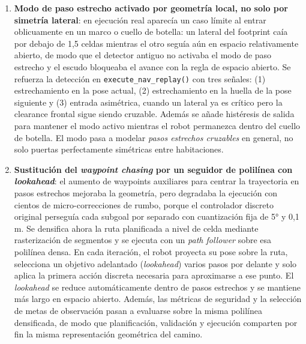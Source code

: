 \documentclass[11pt,a4paper]{article}
\begin{document}
\begin{enumerate}
  \item \textbf{Modo de paso estrecho activado por geometría local, no solo por
        simetría lateral}: en ejecución real aparecía un caso límite al entrar
        oblicuamente en un marco o cuello de botella: un lateral del footprint
        caía por debajo de 1{,}5 celdas mientras el otro seguía aún en espacio
        relativamente abierto, de modo que el detector antiguo no activaba el
        modo de paso estrecho y el escudo bloqueaba el avance con la regla de
        espacio abierto. Se refuerza la detección en
        \texttt{execute\_nav\_replay()} con tres señales:
        (1) estrechamiento en la pose actual, (2) estrechamiento en la huella
        de la pose siguiente y (3) entrada asimétrica, cuando un lateral ya es
        crítico pero la clearance frontal sigue siendo cruzable. Además se
        añade histéresis de salida para mantener el modo activo mientras el
        robot permanezca dentro del cuello de botella. El modo pasa a modelar
        \emph{pasos estrechos cruzables} en general, no solo puertas
        perfectamente simétricas entre habitaciones.

  \item \textbf{Sustitución del \textit{waypoint chasing} por un seguidor de
        polilínea con \textit{lookahead}}: el aumento de waypoints auxiliares
        para centrar la trayectoria en pasos estrechos mejoraba la geometría,
        pero degradaba la ejecución con cientos de micro-correcciones de rumbo,
        porque el controlador discreto original perseguía cada subgoal por
        separado con cuantización fija de 5° y 0{,}1\,m. Se densifica ahora la
        ruta planificada a nivel de celda mediante rasterización de segmentos y
        se ejecuta con un \textit{path follower} sobre esa polilínea densa. En
        cada iteración, el robot proyecta su pose sobre la ruta, selecciona un
        objetivo adelantado (\textit{lookahead}) varios pasos por delante y
        solo aplica la primera acción discreta necesaria para aproximarse a ese
        punto. El \textit{lookahead} se reduce automáticamente dentro de pasos
        estrechos y se mantiene más largo en espacio abierto. Además, las
        métricas de seguridad y la selección de metas de observación pasan a
        evaluarse sobre la misma polilínea densificada, de modo que
        planificación, validación y ejecución comparten por fin la misma
        representación geométrica del camino.


\end{enumerate}
\end{document}
